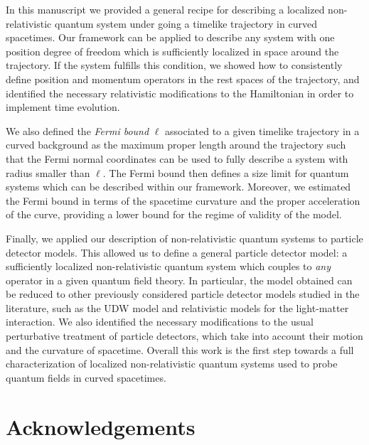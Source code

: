 \documentclass[prd,twocolumn,superscriptaddress,floatfix,amsmath,amssymb,amsfonts,longbibliography,nofootinbib]{revtex4-1}
\newcommand{\mf}{\mathsf}%
\begin{document}
In this manuscript we provided a general recipe for describing a localized non-relativistic quantum system under going a timelike trajectory in curved spacetimes. Our framework can be applied to describe any system with one position degree of freedom which is sufficiently localized in space around the trajectory. If the system fulfills this condition, we showed how to consistently define position and momentum operators in the rest spaces of the trajectory, and identified the necessary relativistic modifications to the Hamiltonian in order to implement time evolution. 

We also defined the \emph{Fermi bound} $\ell$ associated to a given timelike trajectory in a curved background as the maximum proper length around the trajectory such that the Fermi normal coordinates can be used to fully describe a system with radius smaller than $\ell$. The Fermi bound then defines a size limit for quantum systems which can be described within our framework. Moreover, we estimated the Fermi bound in terms of the spacetime curvature and the proper acceleration of the curve, providing a lower bound for the regime of validity of the model.%

Finally, we applied our description of non-relativistic quantum systems to particle detector models. This allowed us to define a general particle detector model: a sufficiently localized non-relativistic quantum system which couples to \emph{any} operator in a given quantum field theory. In particular, the model obtained can be reduced to other previously considered particle detector models studied in the literature, such as the UDW model and relativistic models for the light-matter interaction. We also identified the necessary modifications to the usual perturbative treatment of particle detectors, which take into account their motion and the curvature of spacetime. Overall this work is the first step towards a full characterization of localized non-relativistic quantum systems used to probe quantum fields in curved spacetimes.



\section*{Acknowledgements}
\end{document}
